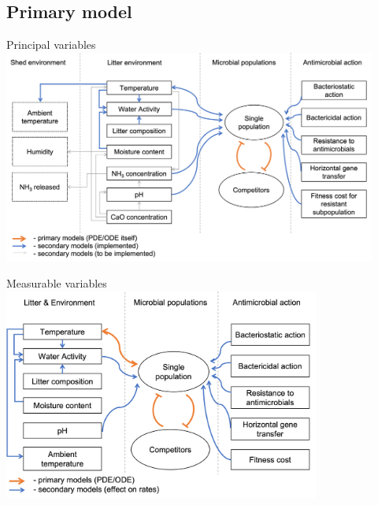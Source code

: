 \documentclass[mathserif,11pt]{beamer}
\begin{document}
\subsection{Primary model}
\begin{frame}{Principal variables}
\centering
	\includegraphics[width=0.92\textwidth]{Figures/variable_interaction.png}
\end{frame}
\begin{frame}{Measurable variables}
\centering
	\includegraphics[width=0.78\textwidth]{Figures/variables_simple.png}
\end{frame}
\end{document}
